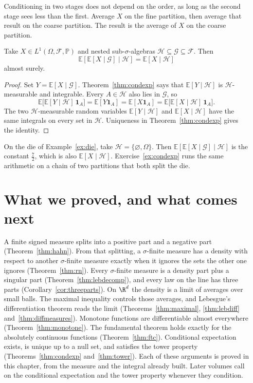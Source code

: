 Conditioning in two stages does not depend on the order, as long as the second stage sees less than the first. Average $X$ on the fine partition, then average that result on the coarse partition. The result is the average of $X$ on the coarse partition.

\begin{theorem}\label{thm:tower}
Take $X\in L^1(\Omega,\mathcal F,\mathbb P)$ and nested sub-$\sigma$-algebras $\mathcal H\subseteq\mathcal G\subseteq\mathcal F$. Then
\[
\mathbb E[\mathbb E[X\mid\mathcal G]\mid\mathcal H]=\mathbb E[X\mid\mathcal H]
\]
almost surely.
\end{theorem}
\begin{proof}
Set $Y=\mathbb E[X\mid\mathcal G]$. Theorem~\ref{thm:condexp} says that $\mathbb E[Y\mid\mathcal H]$ is $\mathcal H$-measurable and integrable. Every $A\in\mathcal H$ also lies in $\mathcal G$, so
\[
\mathbb E\bigl[\mathbb E[Y\mid\mathcal H]\,\mathbf 1_A\bigr]=\mathbb E[Y\mathbf 1_A]=\mathbb E[X\mathbf 1_A]=\mathbb E\bigl[\mathbb E[X\mid\mathcal H]\,\mathbf 1_A\bigr].
\]
The two $\mathcal H$-measurable random variables $\mathbb E[Y\mid\mathcal H]$ and $\mathbb E[X\mid\mathcal H]$ have the same integrals on every set in $\mathcal H$. Uniqueness in Theorem~\ref{thm:condexp} gives the identity.
\end{proof}

On the die of Example~\ref{ex:die}, take $\mathcal H=\{\varnothing,\Omega\}$. Then $\mathbb E[\mathbb E[X\mid\mathcal G]\mid\mathcal H]$ is the constant $\frac72$, which is also $\mathbb E[X\mid\mathcal H]$. Exercise~\ref{ex:condexp} runs the same arithmetic on a chain of two partitions that both split the die.

\section{What we proved, and what comes next}

A finite signed measure splits into a positive part and a negative part (Theorem~\ref{thm:hahn}). From that splitting, a $\sigma$-finite measure has a density with respect to another $\sigma$-finite measure exactly when it ignores the sets the other one ignores (Theorem~\ref{thm:rn}). Every $\sigma$-finite measure is a density part plus a singular part (Theorem~\ref{thm:lebdecomp}), and every law on the line has three parts (Corollary~\ref{cor:threeparts}). On $\R^d$ the density is a limit of averages over small balls. The maximal inequality controls those averages, and Lebesgue's differentiation theorem reads the limit (Theorems~\ref{thm:maximal}, \ref{thm:lebdiff} and~\ref{thm:diffmeasures}). Monotone functions are differentiable almost everywhere (Theorem~\ref{thm:monotone}). The fundamental theorem holds exactly for the absolutely continuous functions (Theorem~\ref{thm:ftc}). Conditional expectation exists, is unique up to a null set, and satisfies the tower property (Theorems~\ref{thm:condexp} and~\ref{thm:tower}). Each of these arguments is proved in this chapter, from the measure and the integral already built. Later volumes call on the conditional expectation and the tower property whenever they condition.

